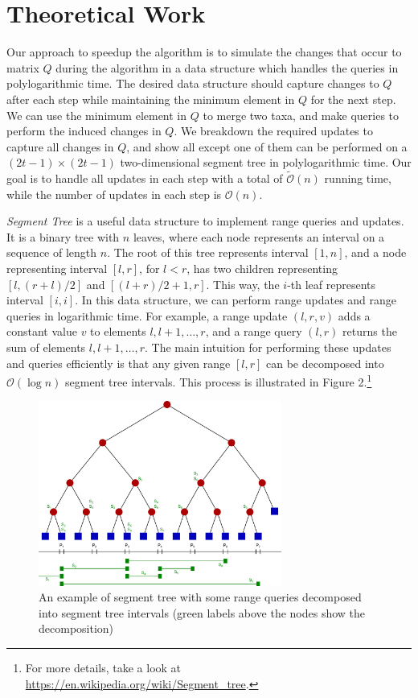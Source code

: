 \section{Theoretical Work}

Our approach to speedup the algorithm is to simulate the changes that occur to matrix $Q$ during the algorithm in a data structure which handles the queries in polylogarithmic time. The desired data structure should capture changes to $Q$ after each step while maintaining the minimum element in $Q$ for the next step. We can use the minimum element in $Q$ to merge two taxa, and make queries to perform the induced changes in $Q$. We breakdown the required updates to capture all changes in $Q$, and show all except one of them can be performed on a $(2t-1) \times (2t-1)$ two-dimensional segment tree in polylogarithmic time. Our goal is to handle all updates in each step with a total of $\widetilde{\mathcal{O}}(n)$ running time, while the number of updates in each step is $\mathcal{O}(n)$.

\emph{Segment Tree} is a useful data structure to implement range queries and updates. It is a binary tree with $n$ leaves, where each node represents an interval on a sequence of length $n$. The root of this tree represents interval $[1, n]$, and a node representing interval $[l, r]$, for $l < r$, has two children representing $[l, (r + l) / 2]$ and $[(l + r) / 2 + 1, r]$. This way, the $i$-th leaf represents interval $[i, i]$. In this data structure, we can perform range updates and range queries in logarithmic time. For example, a range update $(l, r, v)$ adds a constant value $v$ to elements $l, l+1, \ldots, r$, and a range query $(l, r)$ returns the sum of elements $l, l+1, \ldots, r$. The main intuition for performing these updates and queries efficiently is that any given range $[l, r]$ can be decomposed into $\mathcal{O}(\log{n})$ segment tree intervals. This process is illustrated in Figure 2.\footnote{For more details, take a look at \href{https://en.wikipedia.org/wiki/Segment_tree}{https://en.wikipedia.org/wiki/Segment\_tree}.}

\begin{figure}[h!]\label{segment-tree}
	\caption{An example of segment tree with some range queries decomposed into segment tree intervals (green labels above the nodes show the decomposition)}
	\begin{center}
		\includegraphics[width=8cm]{Segment_tree.png}
	\end{center}
\end{figure}

